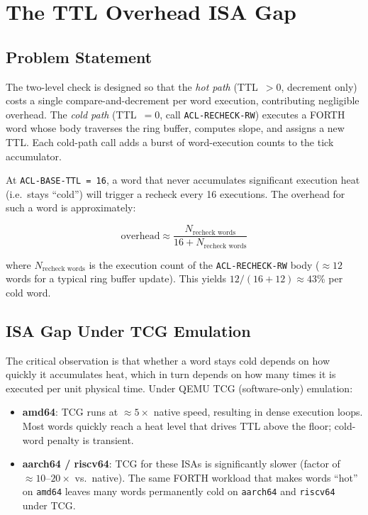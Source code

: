 \documentclass[11pt,letterpaper,openany]{article}
\newcommand{\acl}[1]{\texttt{#1}}
\begin{document}
\section{The TTL Overhead ISA Gap}
\label{sec:isagap}

\subsection{Problem Statement}

The two-level check is designed so that the \emph{hot path}
(TTL~$> 0$, decrement only) costs a single compare-and-decrement per
word execution, contributing negligible overhead.  The \emph{cold path}
(TTL~$= 0$, call \acl{ACL-RECHECK-RW}) executes a FORTH word whose
body traverses the ring buffer, computes slope, and assigns a new TTL.
Each cold-path call adds a burst of word-execution counts to the tick
accumulator.

At \texttt{ACL-BASE-TTL~=~16}, a word that never accumulates
significant execution heat (i.e.\ stays ``cold'') will trigger a
recheck every 16 executions.  The overhead for such a word is
approximately:

\[
\text{overhead} \approx
\frac{N_{\text{recheck words}}}{16 + N_{\text{recheck words}}}
\]

where $N_{\text{recheck words}}$ is the execution count of the
\acl{ACL-RECHECK-RW} body ($\approx\!12$ words for a typical ring
buffer update).  This yields $12/(16+12) \approx 43$\% per cold word.

\subsection{ISA Gap Under TCG Emulation}

The critical observation is that whether a word stays cold depends on
how quickly it accumulates heat, which in turn depends on how many
times it is executed per unit physical time.  Under QEMU TCG
(software-only) emulation:

\begin{itemize}
  \item \textbf{amd64}: TCG runs at $\approx\!5\times$ native speed,
    resulting in dense execution loops.  Most words quickly reach a
    heat level that drives TTL above the floor; cold-word penalty
    is transient.
  \item \textbf{aarch64 / riscv64}: TCG for these ISAs is significantly
    slower (factor of $\approx\!10$--$20\times$ vs.\ native).  The
    same FORTH workload that makes words ``hot'' on \texttt{amd64}
    leaves many words permanently cold on \texttt{aarch64} and
    \texttt{riscv64} under TCG.
\end{itemize}
\end{document}
